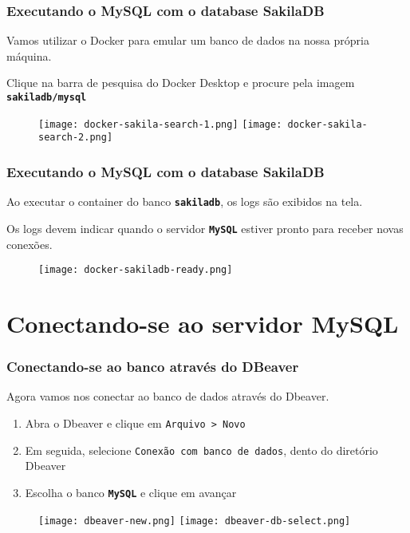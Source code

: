 \documentclass[t, 10pt, aspectratio=169, table, x11names]{beamer}
\begin{document}
	\begin{frame}[t]
		\frametitle{Executando o MySQL com o database SakilaDB}
		Vamos utilizar o Docker para emular um banco de dados na nossa própria máquina.
		
		Clique na barra de pesquisa do Docker Desktop e procure pela imagem \textbf{\texttt{sakiladb/mysql}}
		\vspace{0.3cm}
		\begin{figure}[h]
			\texttt{[image: docker-sakila-search-1.png]}
			\hspace{0.5cm}
			\texttt{[image: docker-sakila-search-2.png]}
		\end{figure}
	\end{frame}
	
	\begin{frame}[t]
		\frametitle{Executando o MySQL com o database SakilaDB}
		Ao executar o container do banco \textbf{\texttt{sakiladb}}, os logs são exibidos na tela.
		
		Os logs devem indicar quando o servidor \texttt{\textbf{MySQL}} estiver pronto para receber novas conexões.
		\vspace{0.1cm}
		\begin{figure}[h]
			\texttt{[image: docker-sakiladb-ready.png]}
		\end{figure}
	\end{frame}

	\section{Conectando-se ao servidor MySQL}

	\begin{frame}[t]
		\frametitle{Conectando-se ao banco através do DBeaver}
		Agora vamos nos conectar ao banco de dados através do Dbeaver.
		
		\begin{enumerate}
			\small
			\item Abra o Dbeaver e clique em \texttt{Arquivo > Novo}
			\item Em seguida, selecione \texttt{Conexão com banco de dados}, dento do diretório Dbeaver
			\item Escolha o banco \texttt{\textbf{MySQL}} e clique em avançar
		\end{enumerate}
		
		\vspace{0.1cm}
		\begin{figure}[h]
			\texttt{[image: dbeaver-new.png]}
			\hspace{0.5cm}
			\texttt{[image: dbeaver-db-select.png]}
		\end{figure}
	\end{frame}
	
\end{document}
